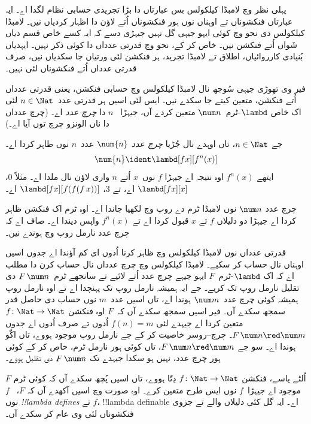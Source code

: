 \documentclass[../../../include/open-logic-section]{subfiles}
\begin{document}

پہلی نظر وچ لامبڈا کیلکولس بس عبارتاں دا بڑا تجریدی حسابی
نظام لگدا اے۔ ایہ عبارتاں فنکشوناں تے اوہناں نوں ہور فنکشوناں
اُتے لاؤن دا اظہار کردیاں نیں۔ لامبڈا کیلکولس دی نحو وچ کوئی
ایہو جیہی گل نہیں جیہڑی دسے کہ ایہ کسے خاص قسم دیاں شَواں
اُتے فنکشن نیں۔ خاص کر کے، نحو وچ قدرتی عدداں دا کوئی ذکر
نہیں۔ ایہدیاں بُنیادی کارروائیاں، اطلاق تے لامبڈا تجرید، ہر
فنکشن لئی ورتیاں جا سکدیاں نیں، صرف قدرتی عدداں اُتے فنکشوناں
لئی نہیں۔

فیر وی تھوڑی جیہی سُوجھ نال لامبڈا کیلکولس وچ حسابی فنکشن،
یعنی قدرتی عدداں اُتے فنکشن، متعین کیتے جا سکدے نیں۔ ایس
لئی اسیں ہر قدرتی عدد~$n \in
\Nat$ لئی اک خاص $\lambd$-ٹرم~$\num n$ متعین کردے آں، جیہڑا
~$n$ دا \emph{چرچ عدد} اے۔ (چرچ عدداں دا ناں الونزو چرچ توں آیا اے۔)

\begin{defn}
  جے $n \in \Nat$، تاں اوہدے نال جُڑیا \emph{چرچ عدد} $\num{n}$
  عدد~$n$ نوں ظاہر کردا اے۔
  \[
    \num{n} \ident \lambd[fx][f^n(x)]
  \]
  ایتھے $f^n(x)$ اوہ نتیجہ اے جیہڑا $f$ نوں~$x$ اُتے $n$
  واری لاؤن نال ملدا اے۔ مثلاً $\num{0}$، $\lambd[fx][x]$ اے،
  تے $\num{3}$، $\lambd[fx][f(f(f\,x))]$ اے۔
\end{defn}

چرچ عدد $\num n$ نوں لامبڈا ٹرم دے روپ وچ لکھیا جاندا اے۔
اوہ ٹرم اک فنکشن ظاہر کردا اے جیہڑا دو دلیلاں $f$ تے $x$
قبول کردا اے تے $f^n(x)$ واپس دیندا اے۔ صاف اے کہ چرچ
عدد نارمل روپ وچ ہوندے نیں۔

قدرتی عدداں نوں لامبڈا کیلکولس وچ ظاہر کرنا اُدوں ای کم آؤندا
اے جدوں اسیں اوہناں نال حساب کر سکیے۔ لامبڈا کیلکولس وچ
چرچ عدداں نال حساب کرن دا مطلب اے کہ اک $\lambd$-ٹرم~$F$
ایہو جیہے چرچ عدد اُتے لائیے تے سانجھے ٹرم~$F\, \num n$ دی
تقلیل نارمل روپ تک کریے۔ جے ایہ ہمیشہ نارمل روپ تک پہنچدا
اے تے اوہ نارمل روپ ہمیشہ کوئی چرچ عدد~$\num m$ ہوندا اے،
تاں اسیں عدد~$m$ نوں حساب دی حاصل قدر سمجھ سکدے آں۔
فیر اسیں سمجھ سکدے آں کہ~$F$ اوہ فنکشن $f\colon \Nat \to \Nat$
متعین کردا اے جیہدے لئی $f(n) = m$ اُدوں تے صرف اُدوں
اے جدوں $F\, \num n \red \num m$۔ چرچ–روسر خاصیت کر کے
جے نارمل روپ موجود ہووے، تاں اکّو ہوندا اے۔ سو جے
$F\, \num n \red \num m$، تاں کوئی ہور نارمل ٹرم، خاص کر کے کوئی
ہور چرچ عدد، نہیں ہو سکدا جیہدے تک $F \, \num n$ دی تقلیل ہووے۔

اُلٹے پاسے، فنکشن $f\colon \Nat \to \Nat$ دِتّا ہووے، تاں
اسیں پُچھ سکدے آں کہ کوئی ٹرم $F$ موجود اے جیہڑا~$f$ نوں
ایس طرح متعین کرے۔ اوہ صورت وچ اسیں آکھدے آں کہ $F$،
~$f$ نوں \emph{!!{lambda define}s} تے $f$، !!{lambda definable}
اے۔ ایہ گل کئی دلیلاں والے تے جزوی فنکشوناں لئی وی عام کر سکدے آں۔
\end{document}
